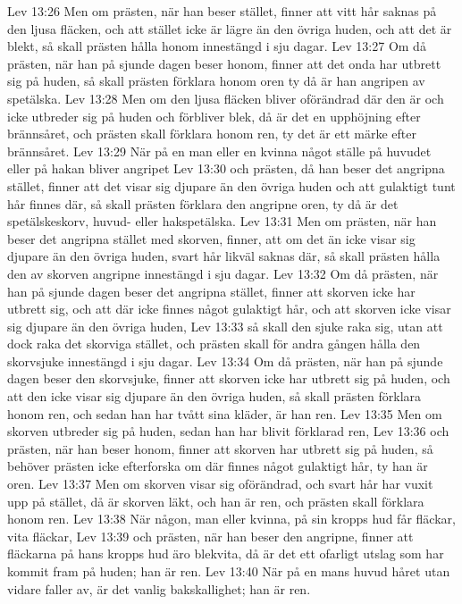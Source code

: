 Lev 13:26  Men om prästen, när han beser stället, finner att vitt hår saknas på den ljusa fläcken, och att stället icke är lägre än den övriga huden, och att det är blekt, så skall prästen hålla honom innestängd i sju dagar.
Lev 13:27  Om då prästen, när han på sjunde dagen beser honom, finner att det onda har utbrett sig på huden, så skall prästen förklara honom oren ty då är han angripen av spetälska.
Lev 13:28  Men om den ljusa fläcken bliver oförändrad där den är och icke utbreder sig på huden och förbliver blek, då är det en upphöjning efter brännsåret, och prästen skall förklara honom ren, ty det är ett märke efter brännsåret.
Lev 13:29  När på en man eller en kvinna något ställe på huvudet eller på hakan bliver angripet
Lev 13:30  och prästen, då han beser det angripna stället, finner att det visar sig djupare än den övriga huden och att gulaktigt tunt hår finnes där, så skall prästen förklara den angripne oren, ty då är det spetälskeskorv, huvud- eller hakspetälska.
Lev 13:31  Men om prästen, när han beser det angripna stället med skorven, finner, att om det än icke visar sig djupare än den övriga huden, svart hår likväl saknas där, så skall prästen hålla den av skorven angripne innestängd i sju dagar.
Lev 13:32  Om då prästen, när han på sjunde dagen beser det angripna stället, finner att skorven icke har utbrett sig, och att där icke finnes något gulaktigt hår, och att skorven icke visar sig djupare än den övriga huden,
Lev 13:33  så skall den sjuke raka sig, utan att dock raka det skorviga stället, och prästen skall för andra gången hålla den skorvsjuke innestängd i sju dagar.
Lev 13:34  Om då prästen, när han på sjunde dagen beser den skorvsjuke, finner att skorven icke har utbrett sig på huden, och att den icke visar sig djupare än den övriga huden, så skall prästen förklara honom ren, och sedan han har tvått sina kläder, är han ren.
Lev 13:35  Men om skorven utbreder sig på huden, sedan han har blivit förklarad ren,
Lev 13:36  och prästen, när han beser honom, finner att skorven har utbrett sig på huden, så behöver prästen icke efterforska om där finnes något gulaktigt hår, ty han är oren.
Lev 13:37  Men om skorven visar sig oförändrad, och svart hår har vuxit upp på stället, då är skorven läkt, och han är ren, och prästen skall förklara honom ren.
Lev 13:38  När någon, man eller kvinna, på sin kropps hud får fläckar, vita fläckar,
Lev 13:39  och prästen, när han beser den angripne, finner att fläckarna på hans kropps hud äro blekvita, då är det ett ofarligt utslag som har kommit fram på huden; han är ren.
Lev 13:40  När på en mans huvud håret utan vidare faller av, är det vanlig bakskallighet; han är ren.

